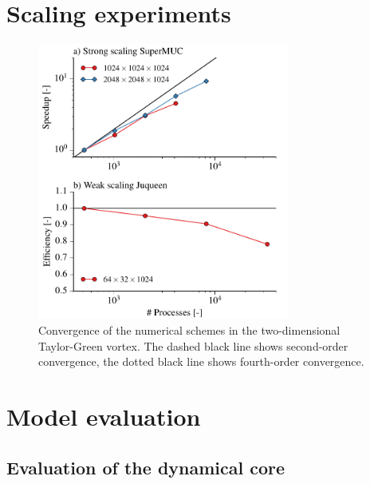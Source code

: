 \documentclass[gmd]{copernicus}
\begin{document}
\section{Scaling experiments}
\begin{figure}[t]
\vspace*{2mm}
\begin{center}
\includegraphics[width=8.3cm]{figs/scaling.pdf}
\end{center}
\caption{Convergence of the numerical schemes in the two-dimensional Taylor-Green vortex. The dashed black line shows second-order convergence, the dotted black line shows fourth-order convergence.}
\end{figure}

\section{Model evaluation}
\subsection{Evaluation of the dynamical core}
\end{document}
